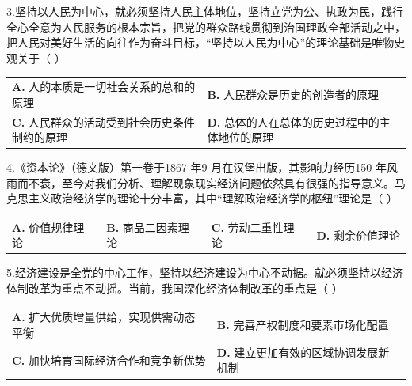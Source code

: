\documentclass[UTF8,11pt]{ctexart}
\begin{document}
3.坚持以人民为中心，就必须坚持人民主体地位，坚持立党为公、执政为民，践行全心全意为人民服务的根本宗旨，把党的群众路线贯彻到治国理政全部活动之中，把人民对美好生活的向往作为奋斗目标，“坚持以人民为中心”的理论基础是唯物史观关于（  ）


\begin{center}\begin{tabular}{>{\raggedright\arraybackslash}p{\dimexpr(\linewidth-4\tabcolsep)/2\relax}>{\raggedright\arraybackslash}p{\dimexpr(\linewidth-4\tabcolsep)/2\relax}}
\textbf{A.} 人的本质是一切社会关系的总和的原理 & \textbf{B.} 人民群众是历史的创造者的原理\\[.35em]
\textbf{C.} 人民群众的活动受到社会历史条件制约的原理 & \textbf{D.} 总体的人在总体的历史过程中的主体地位的原理\\[.35em]\end{tabular}\end{center}

4.《资本论》（德文版）第一卷于1867 年9 月在汉堡出版，其影响力经历150 年风雨而不衰，至今对我们分析、理解现象现实经济问题依然具有很强的指导意义。马克思主义政治经济学的理论十分丰富，其中“理解政治经济学的枢纽”理论是（  ）


\begin{center}\begin{tabular}{>{\raggedright\arraybackslash}p{\dimexpr(\linewidth-8\tabcolsep)/4\relax}>{\raggedright\arraybackslash}p{\dimexpr(\linewidth-8\tabcolsep)/4\relax}>{\raggedright\arraybackslash}p{\dimexpr(\linewidth-8\tabcolsep)/4\relax}>{\raggedright\arraybackslash}p{\dimexpr(\linewidth-8\tabcolsep)/4\relax}}
\textbf{A.} 价值规律理论 & \textbf{B.} 商品二因素理论 & \textbf{C.} 劳动二重性理论 & \textbf{D.} 剩余价值理论\\[.35em]\end{tabular}\end{center}

5.经济建设是全党的中心工作，坚持以经济建设为中心不动据。就必须坚持以经济体制改革为重点不动摇。当前，我国深化经济体制改革的重点是（  ）


\begin{center}\begin{tabular}{>{\raggedright\arraybackslash}p{\dimexpr(\linewidth-4\tabcolsep)/2\relax}>{\raggedright\arraybackslash}p{\dimexpr(\linewidth-4\tabcolsep)/2\relax}}
\textbf{A.} 扩大优质增量供给，实现供需动态平衡 & \textbf{B.} 完善产权制度和要素市场化配置\\[.35em]
\textbf{C.} 加快培育国际经济合作和竞争新优势 & \textbf{D.} 建立更加有效的区域协调发展新机制\\[.35em]\end{tabular}\end{center}
\end{document}
